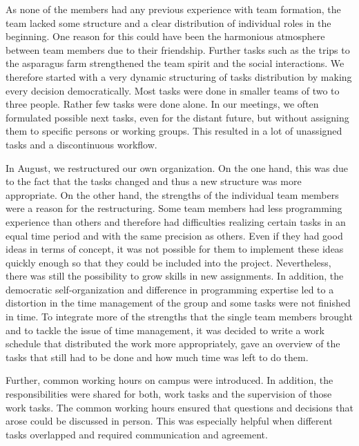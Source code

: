 \bigskip
As none of the members had any previous experience with team formation, the team lacked some structure and a clear distribution of individual roles in the beginning. One reason for this could have been the harmonious atmosphere between team members due to their friendship. Further tasks such as the trips to the asparagus farm strengthened the team spirit and the social interactions. We therefore started with a very dynamic structuring of tasks distribution by making every decision democratically. Most tasks were done in smaller teams of two to three people. Rather few tasks were done alone. In our meetings, we often formulated possible next tasks, even for the distant future, but  without assigning them to specific persons or working groups. This resulted in a lot of unassigned tasks and a discontinuous workflow. 

In August, we restructured our own organization. On the one hand, this was due to the fact that the tasks changed and thus a new structure was more appropriate. On the other hand, the strengths of the individual team members were a reason for the restructuring. Some team members had less programming experience than others and therefore had difficulties realizing certain tasks in an equal time period and with the same precision as others. Even if they had good ideas in terms of concept, it was not possible for them to implement these ideas quickly enough so that they could be included into the project. Nevertheless, there was still the possibility to grow skills in new assignments. In addition, the democratic self-organization and difference in programming expertise led to a distortion in the time management of the group and some tasks were not finished in time. To integrate more of the strengths that the single team members brought and to tackle the issue of time management, it was decided to write a work schedule that distributed the work more appropriately, gave an overview of the tasks that still had to be done and how much time was left to do them.

Further, common working hours on campus were introduced. In addition, the responsibilities were shared for both, work tasks and the supervision of those work tasks. The common working hours ensured that questions and decisions that arose could be discussed in person. This was especially helpful when different tasks overlapped and required communication and agreement.

